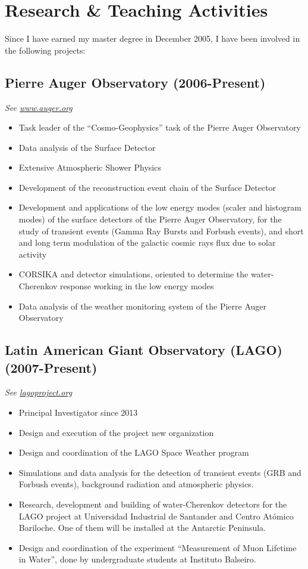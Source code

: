 \ifeng
\section*{Research \& Teaching Activities}

Since I have earned my master degree in December 2005, I have been involved in the following projects:

\subsection*{Pierre Auger Observatory (2006-Present)}
{\small{\textit{See \href{http://www.auger.org/}{www.auger.org}}}}
\begin{itemize}
\item Task leader of the ``Cosmo-Geophysics'' task of the Pierre Auger Observatory
\item Data analysis of the Surface Detector
\item Extensive Atmospheric Shower Physics
\item Development of the reconstruction event chain of the Surface Detector
\item Development and applications of the low energy modes (scaler and histogram
modes) of the surface detectors of the Pierre Auger Observatory, for the study
of transient events (Gamma Ray Bursts and Forbush events), and short and long
term modulation of the galactic cosmic rays flux due to solar activity
\item CORSIKA and detector simulations, oriented to determine the
water-Cherenkov response working in the low energy modes
\item Data analysis of the weather monitoring system of the Pierre Auger
Observatory
\end{itemize}

\subsection*{Latin American Giant Observatory (LAGO) (2007-Present)}
{\small{\textit{See \href{http://lagoproject.org}{lagoproject.org}}}}
\begin{itemize}
\item Principal Investigator since 2013
\item Design and execution of the project new organization
\item Design and coordination of the LAGO Space Weather program 
\item Simulations and data analysis for the detection of transient events
(GRB and Forbush events), background radiation and atmospheric physics.
\item Research, development and building of water-Cherenkov detectors for the
	LAGO project at Universidad Industrial de Santander and Centro Atómico
	Bariloche. One of them will be
installed at the Antarctic Peninsula.
\item Design and coordination of the experiment ``Measurement of Muon Lifetime in Water'', done by undergraduate students at Instituto Balseiro.
\end{itemize}


